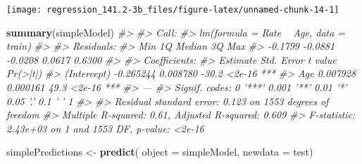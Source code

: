 \documentclass[]{book}
\newenvironment{Shaded}{\begin{snugshade}}{\end{snugshade}}
\newcommand{\CommentTok}[1]{\textcolor[rgb]{0.56,0.35,0.01}{\textit{#1}}}
\newcommand{\DataTypeTok}[1]{\textcolor[rgb]{0.13,0.29,0.53}{#1}}
\newcommand{\DecValTok}[1]{\textcolor[rgb]{0.00,0.00,0.81}{#1}}
\newcommand{\KeywordTok}[1]{\textcolor[rgb]{0.13,0.29,0.53}{\textbf{#1}}}
\newcommand{\NormalTok}[1]{#1}
\newcommand{\OperatorTok}[1]{\textcolor[rgb]{0.81,0.36,0.00}{\textbf{#1}}}
\newcommand{\StringTok}[1]{\textcolor[rgb]{0.31,0.60,0.02}{#1}}
\begin{document}
\begin{Shaded}
\end{Shaded}

\begin{center}\texttt{[image: regression\_141.2-3b\_files/figure-latex/unnamed-chunk-14-1]} \end{center}

\begin{Shaded}
\begin{Highlighting}[]
\KeywordTok{summary}\NormalTok{(simpleModel)}
\CommentTok{#> }
\CommentTok{#> Call:}
\CommentTok{#> lm(formula = Rate ~ Age, data = train)}
\CommentTok{#> }
\CommentTok{#> Residuals:}
\CommentTok{#>     Min      1Q  Median      3Q     Max }
\CommentTok{#> -0.1799 -0.0881 -0.0208  0.0617  0.6300 }
\CommentTok{#> }
\CommentTok{#> Coefficients:}
\CommentTok{#>              Estimate Std. Error t value Pr(>|t|)    }
\CommentTok{#> (Intercept) -0.265244   0.008780   -30.2   <2e-16 ***}
\CommentTok{#> Age          0.007928   0.000161    49.3   <2e-16 ***}
\CommentTok{#> ---}
\CommentTok{#> Signif. codes:  0 '***' 0.001 '**' 0.01 '*' 0.05 '.' 0.1 ' ' 1}
\CommentTok{#> }
\CommentTok{#> Residual standard error: 0.123 on 1553 degrees of freedom}
\CommentTok{#> Multiple R-squared:  0.61,   Adjusted R-squared:  0.609 }
\CommentTok{#> F-statistic: 2.43e+03 on 1 and 1553 DF,  p-value: <2e-16}
\end{Highlighting}
\end{Shaded}

\begin{Shaded}
\begin{Highlighting}[]
\NormalTok{simplePredictions <-}\StringTok{ }\KeywordTok{predict}\NormalTok{(}
  \DataTypeTok{object =}\NormalTok{ simpleModel,}
  \DataTypeTok{newdata =}\NormalTok{ test)}
\end{Highlighting}
\end{Shaded}
\end{document}
